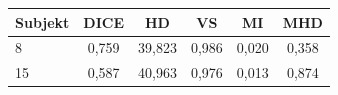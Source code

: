 \begin{tabular}{l c c c c c}
 \hline
Subjekt & DICE & HD & VS & MI & MHD \\ \hline
8 & 0,759 & 39,823 & 0,986 & 0,020 & 0,358 \\
15 & 0,587 & 40,963 & 0,976 & 0,013 & 0,874 \\
\hline 
 \end{tabular}
